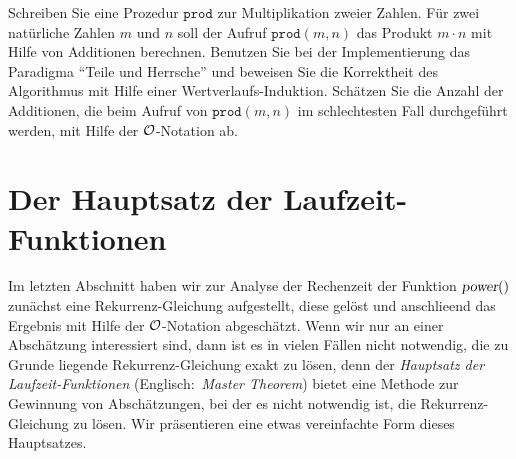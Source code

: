 \exercise
Schreiben Sie eine Prozedur $\mathtt{prod}$ zur Multiplikation zweier Zahlen.
F\"ur zwei nat\"urliche Zahlen $m$ und $n$ soll der Aufruf $\mathtt{prod}(m, n)$  das Produkt
$m\cdot n$ mit Hilfe von Additionen
berechnen.  Benutzen Sie bei der Implementierung das Paradigma ``Teile und Herrsche'' und
beweisen Sie die Korrektheit des Algorithmus mit Hilfe einer Wertverlaufs-Induktion.
Sch\"atzen  Sie die Anzahl der Additionen, die beim Aufruf von $\mathtt{prod}(m,n)$
im schlechtesten Fall durchgef\"uhrt werden, mit Hilfe der $\mathcal{O}$-Notation ab. 
\pagebreak

\section{Der Hauptsatz der Laufzeit-Funktionen}
Im letzten Abschnitt haben wir zur Analyse der Rechenzeit der Funktion $\textsl{power}()$
zun\"achst eine Rekurrenz-Gleichung aufgestellt, diese gel\"ost und anschlie\3end das Ergebnis
mit Hilfe der $\mathcal{O}$-Notation abgesch\"atzt.  Wenn wir nur an einer Absch\"atzung interessiert
sind, dann ist es in vielen F\"allen nicht notwendig, die zu Grunde liegende
Rekurrenz-Gleichung exakt zu l\"osen, denn der \textsl{Hauptsatz der Laufzeit-Funktionen}
(Englisch:~\textsl{Master Theorem}) \cite{cormen:01} bietet eine Methode zur Gewinnung von Absch\"atzungen,
bei der es nicht notwendig ist, die Rekurrenz-Gleichung zu l\"osen.  
Wir pr\"asentieren eine etwas vereinfachte Form dieses Hauptsatzes.

